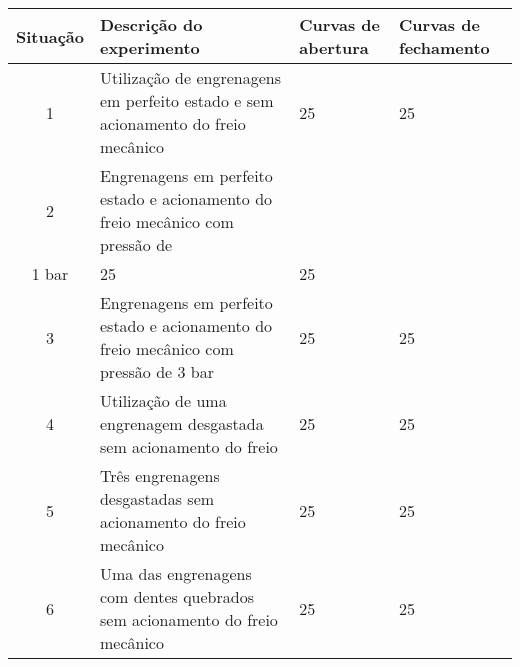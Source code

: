 \begin{tabular}{clll}
  \toprule
  Situação & Descrição do experimento                                                             & Curvas de abertura & Curvas de fechamento \\
  \midrule
  1        & Utilização de engrenagens em perfeito estado e sem acionamento do freio mecânico     & 25                 & 25                   \\
  2        & Engrenagens em perfeito estado e acionamento do freio mecânico com pressão de\\1 bar & 25                 & 25                   \\
  3        & Engrenagens em perfeito estado e acionamento do freio mecânico com pressão de 3 bar  & 25                 & 25                   \\
  4        & Utilização de uma engrenagem desgastada sem acionamento do freio                     & 25                 & 25                   \\
  5        & Três engrenagens desgastadas sem acionamento do freio mecânico                       & 25                 & 25                   \\
  6        & Uma das engrenagens com dentes quebrados sem acionamento do freio mecânico           & 25                 & 25                   \\
  \bottomrule
\end{tabular}
